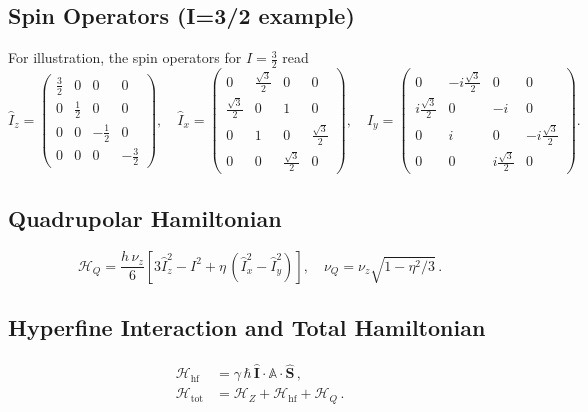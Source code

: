 \documentclass[12pt]{article}
\begin{document}
\subsection{Spin Operators (I=3/2 example)}
For illustration, the spin operators for \(I=\tfrac{3}{2}\) read
\begin{equation}
\hat{I}_z =
\begin{pmatrix}
 \tfrac{3}{2} & 0 & 0 & 0\\
 0 & \tfrac{1}{2} & 0 & 0\\
 0 & 0 & -\tfrac{1}{2} & 0\\
 0 & 0 & 0 & -\tfrac{3}{2}
\end{pmatrix},\quad
\hat{I}_x =
\begin{pmatrix}
 0 & \tfrac{\sqrt{3}}{2} & 0 & 0\\
 \tfrac{\sqrt{3}}{2} & 0 & 1 & 0\\
 0 & 1 & 0 & \tfrac{\sqrt{3}}{2}\\
 0 & 0 & \tfrac{\sqrt{3}}{2} & 0
\end{pmatrix},\quad
\hat{I}_y =
\begin{pmatrix}
 0 & -i\tfrac{\sqrt{3}}{2} & 0 & 0\\
 i\tfrac{\sqrt{3}}{2} & 0 & -i & 0\\
 0 & i & 0 & -i\tfrac{\sqrt{3}}{2}\\
 0 & 0 & i\tfrac{\sqrt{3}}{2} & 0
\end{pmatrix}.
\end{equation}

\subsection{Quadrupolar Hamiltonian}
\begin{equation}
\mathcal{H}_Q = \frac{h\,\nu_z}{6}\left[3\hat{I}_z^2 - I^2 + \eta\,(\hat{I}_x^2 - \hat{I}_y^2)\right],\quad \nu_Q = \nu_z\sqrt{1-\eta^2/3}\,.
\end{equation}

\subsection{Hyperfine Interaction and Total Hamiltonian}
\begin{align}
\mathcal{H}_{\mathrm{hf}} &= \gamma\,\hbar\, \hat{\mathbf{I}}\cdot\mathbb{A}\cdot\hat{\mathbf{S}}\,,\\
\mathcal{H}_{\mathrm{tot}} &= \mathcal{H}_Z + \mathcal{H}_{\mathrm{hf}} + \mathcal{H}_Q\,.
\end{align}
\end{document}
